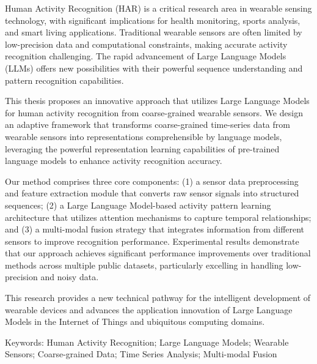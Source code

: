 Human Activity Recognition (HAR) is a critical research area in wearable sensing technology, with significant implications for health monitoring, sports analysis, and smart living applications. Traditional wearable sensors are often limited by low-precision data and computational constraints, making accurate activity recognition challenging. The rapid advancement of Large Language Models (LLMs) offers new possibilities with their powerful sequence understanding and pattern recognition capabilities.

This thesis proposes an innovative approach that utilizes Large Language Models for human activity recognition from coarse-grained wearable sensors. We design an adaptive framework that transforms coarse-grained time-series data from wearable sensors into representations comprehensible by language models, leveraging the powerful representation learning capabilities of pre-trained language models to enhance activity recognition accuracy.

Our method comprises three core components: (1) a sensor data preprocessing and feature extraction module that converts raw sensor signals into structured sequences; (2) a Large Language Model-based activity pattern learning architecture that utilizes attention mechanisms to capture temporal relationships; and (3) a multi-modal fusion strategy that integrates information from different sensors to improve recognition performance. Experimental results demonstrate that our approach achieves significant performance improvements over traditional methods across multiple public datasets, particularly excelling in handling low-precision and noisy data.

This research provides a new technical pathway for the intelligent development of wearable devices and advances the application innovation of Large Language Models in the Internet of Things and ubiquitous computing domains.

Keywords: Human Activity Recognition; Large Language Models; Wearable Sensors; Coarse-grained Data; Time Series Analysis; Multi-modal Fusion